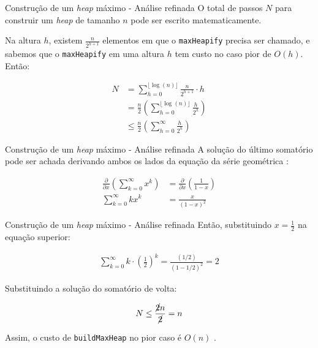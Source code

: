 \documentclass[t, 10pt]{beamer}
\begin{document}
  \begin{frame}{Construção de um \emph{heap} máximo - Análise refinada}
    O total de passos $N$ para construir um \emph{heap} de tamanho $n$
    pode ser escrito matematicamente.

    Na altura $h$, existem $\frac{n}{2 ^ {h + 1}}$ elementos em que o
    \texttt{maxHeapify} precisa ser chamado, e sabemos que o 
    \texttt{maxHeapify} em uma altura $h$ tem custo no caso pior
    de $O(h)$. Então:
    
    \vspace{-1em}
    \begin{align*}
      N &= \sum_{h = 0}^{\lfloor\log(n)\rfloor} \frac{n}{2 ^ {h + 1}} \cdot h \\
        &= \frac{n}{2} \left(\sum_{h = 0}^{\lfloor\log(n)\rfloor} \frac{h}{2 ^ h}\right) \\
        &\leq \frac{n}{2} \left(\sum_{h = 0}^{\infty} \frac{h}{2 ^ h}\right)
    \end{align*}
    
  \end{frame}

  \begin{frame}{Construção de um \emph{heap} máximo - Análise refinada}
    A solução do último somatório pode ser achada derivando ambos os lados
    da equação da série geométrica \footnotemark[1]:

    \begin{align*}
      \frac{\partial}{\partial x}\left(\sum_{k = 0}^{\infty} x ^ k\right)
      &= \frac{\partial}{\partial x}\left(\frac{1}{1 - x}\right) \\
      \sum_{k = 0}^{\infty} kx ^ k &= \frac{x}{(1 - x) ^ 2}
    \end{align*}

  \end{frame}

  \begin{frame}[c]{Construção de um \emph{heap} máximo - Análise refinada}
    Então, substituindo $x = \frac{1}{2}$ na equação superior:

    \begin{align*}
      \sum_{k = 0}^{\infty} k \cdot \left(\frac{1}{2}\right) ^ k =
      \frac{(1 / 2)}{(1 - 1 / 2) ^ 2} = 2
    \end{align*}

    Substituindo a solução do somatório de volta:

    $$N \leq \frac{\cancel{2}n}{\cancel{2}} = n$$

    Assim, o custo de \texttt{buildMaxHeap} no pior caso é $O(n)$ \footnotemark[1].

  \end{frame}
\end{document}
